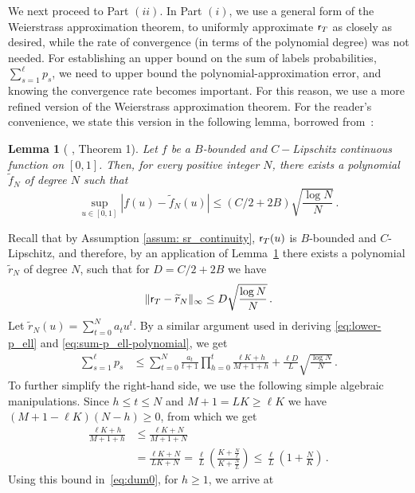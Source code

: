 \documentclass[11pt]{article}
\newtheorem{lemma}[propo]{Lemma}
\begin{document}
We next proceed to Part $(ii)$. In Part $(i)$, we use a general form of the Weierstrass approximation theorem, to uniformly approximate $\mathsf{r}_T$ as closely as desired, while the rate of convergence (in terms of the polynomial degree) was not needed.
For establishing an upper bound on the sum of labels probabilities,  $\sum\limits_{s=1}^{\ell}p_s$, we need to upper bound the polynomial-approximation error, and knowing the convergence rate becomes important. For this reason, we use a more refined  version of the Weierstrass approximation theorem. For the reader's convenience, we state this version in the following lemma, borrowed from~\cite{gzyl1997weierstrass}:
\begin{lemma}[ \cite{gzyl1997weierstrass}, Theorem 1]\label{lem:poly}
	Let $f$ be a $B$-bounded and  $C-$Lipschitz continuous function on $[0,1]$. Then, for every positive integer $N$, there exists a polynomial $\widetilde{f}_N$ of degree $N$ such that
	\[
\sup\limits_{u\in[0,1]}^{}|f(u)- \widetilde{f}_N(u)|\leq(C/2+2B) \sqrt{\frac{\log{N}}{N}}\,.
	\]
\end{lemma}
	Recall that by Assumption \ref{assum: sr_continuity}, $\mathsf{r}_T(u)$ is $B$-bounded and $C$-Lipschitz, and therefore, by an application of Lemma~\ref{lem:poly} there exists a polynomial $\widetilde{r}_N$ of degree $N$, such that for $D=C/2+2B$ we have
	\begin{equation}\label{eq:unif-Bernstein-polynomials}
	\|\mathsf{r}_{T}-\widetilde{r}_N\|_\infty \leq D\sqrt{\frac{\log{N}}{N}}\,.
	\end{equation}
	Let $\widetilde{r}_N(u)=\sum\limits_{t=0}^{N}a_tu^t$. By a similar argument used in deriving \eqref{eq:lower-p_ell} and \eqref{eq:sum-p_ell-polynomial}, we get
	\begin{align}\label{eq:dum0}
	\sum\limits_{s=1}^{\ell}p_s&\leq \sum\limits_{t=0}^{N} \frac{a_t}{t+1}\prod\limits_{h=0}^{t}\frac{\ell K +h}{M+1+h} + \frac{\ell D}{L}\sqrt{\frac{\log{N}}{N}}\,.
	\end{align}
To further simplify the right-hand side, we use the following simple algebraic manipulations. Since $h\le t\le N$ and $M+1 = LK\ge \ell K$ we have $(M+1-\ell K)(N-h)\ge0$, from which we get 
\begin{align*}
\frac{\ell K+h}{M+1+h} &\leq  \frac{\ell K+N}{M+1+N}\\
&= \frac{\ell K+N}{LK+N} =\frac{\ell}{L}\left(\frac{K+\tfrac{N}{\ell}}{K+\tfrac{N}{L}}\right)\le \frac{\ell}{L}\left(1+\frac{N}{K}\right)\,.
\end{align*}
Using this bound in~\eqref{eq:dum0}, for $h\ge 1$, we arrive at
\end{document}
